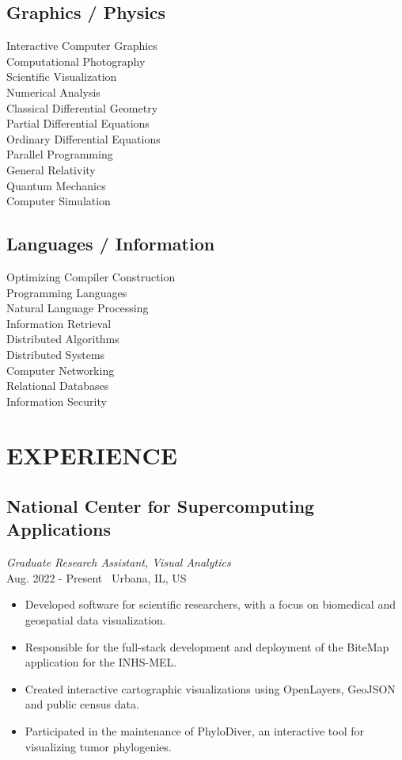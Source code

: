 \documentclass[11pt,twocolumn]{article}
\begin{document}
\subsection*{{Graphics / Physics}}
Interactive Computer Graphics\\
Computational Photography\\
Scientific Visualization\\
Numerical Analysis\\
Classical Differential Geometry\\
Partial Differential Equations\\
Ordinary Differential Equations\\
Parallel Programming\\
General Relativity\\
Quantum Mechanics\\
Computer Simulation

\subsection*{{Languages / Information}}
Optimizing Compiler Construction\\
Programming Languages\\
Natural Language Processing\\
Information Retrieval\\
Distributed Algorithms\\
Distributed Systems\\
Computer Networking\\
Relational Databases\\
Information Security\\

\newpage

\section*{\textnormal{EXPERIENCE}}

\subsection*{National Center for Supercomputing Applications}
\textit{Graduate Research Assistant, Visual Analytics} \\
Aug. 2022 - Present \textbullet\ Urbana, IL, US

\begin{itemize}
\item Developed software for scientific researchers, with a focus on biomedical and geospatial data visualization.
\item Responsible for the full-stack development and deployment of the BiteMap application for the INHS-MEL.
\item Created interactive cartographic visualizations using OpenLayers, GeoJSON and public census data.
\item Participated in the maintenance of PhyloDiver, an interactive tool for visualizing tumor phylogenies.
\end{itemize}
\end{document}
